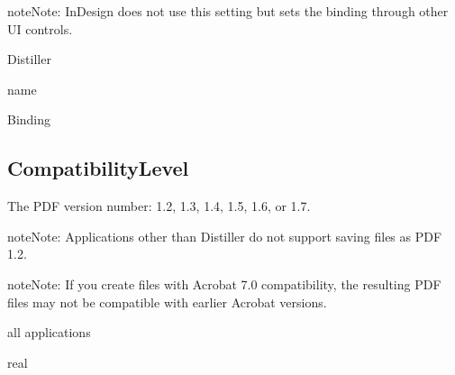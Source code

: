 \documentclass[letterpaper,12pt,english,openany,oneside]{sphinxmanual}
\begin{document}
\begin{sphinxadmonition}{note}{Note:}
InDesign does not use this setting but sets the binding through other UI controls.
\end{sphinxadmonition}
\label{\detokenize{PDF_Create_CommonSettings:supported-by-2}}

Distiller

\label{\detokenize{PDF_Create_CommonSettings:type-2}}

name

\label{\detokenize{PDF_Create_CommonSettings:ui-name-2}}

Binding

\label{\detokenize{PDF_Create_CommonSettings:default-value-2}}

\begin{sphinxVerbatim}[commandchars=\\\{\}]
\end{sphinxVerbatim}




\subsection{CompatibilityLevel}
\label{\detokenize{PDF_Create_CommonSettings:compatibilitylevel}}
The PDF version number: 1.2, 1.3, 1.4, 1.5, 1.6, or 1.7.

\begin{sphinxadmonition}{note}{Note:}
Applications other than Distiller do not support saving files as PDF 1.2.
\end{sphinxadmonition}

\begin{sphinxadmonition}{note}{Note:}
If you create files with Acrobat 7.0 compatibility, the resulting PDF files may not be compatible with earlier Acrobat versions.
\end{sphinxadmonition}
\label{\detokenize{PDF_Create_CommonSettings:supported-by-3}}

all applications

\label{\detokenize{PDF_Create_CommonSettings:type-3}}

real

\label{\detokenize{PDF_Create_CommonSettings:ui-name-3}}
\end{document}
